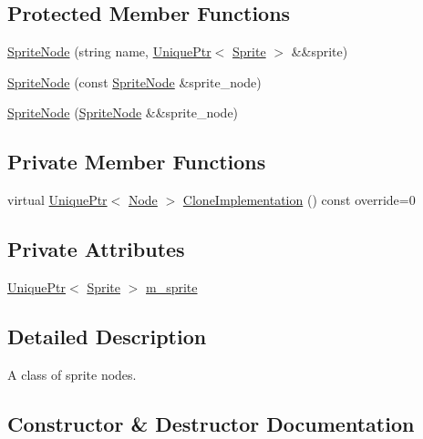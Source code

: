 \subsection*{Protected Member Functions}
\begin{DoxyCompactItemize}
\item 
\hyperlink{classmage_1_1_sprite_node_a17e7dc6256da6900a65dd35b38db2a1f}{Sprite\+Node} (string name, \hyperlink{namespacemage_a3316d7143a973e37adf1110f2e80ca31}{Unique\+Ptr}$<$ \hyperlink{classmage_1_1_sprite}{Sprite} $>$ \&\&sprite)
\item 
\hyperlink{classmage_1_1_sprite_node_a5744942fd29d59c34820d9bb3bdd17b7}{Sprite\+Node} (const \hyperlink{classmage_1_1_sprite_node}{Sprite\+Node} \&sprite\+\_\+node)
\item 
\hyperlink{classmage_1_1_sprite_node_af57c27c8fd399eb00f46a482192f6994}{Sprite\+Node} (\hyperlink{classmage_1_1_sprite_node}{Sprite\+Node} \&\&sprite\+\_\+node)
\end{DoxyCompactItemize}
\subsection*{Private Member Functions}
\begin{DoxyCompactItemize}
\item 
virtual \hyperlink{namespacemage_a3316d7143a973e37adf1110f2e80ca31}{Unique\+Ptr}$<$ \hyperlink{classmage_1_1_node}{Node} $>$ \hyperlink{classmage_1_1_sprite_node_a83a2a865b38670d64491a1066895e218}{Clone\+Implementation} () const override=0
\end{DoxyCompactItemize}
\subsection*{Private Attributes}
\begin{DoxyCompactItemize}
\item 
\hyperlink{namespacemage_a3316d7143a973e37adf1110f2e80ca31}{Unique\+Ptr}$<$ \hyperlink{classmage_1_1_sprite}{Sprite} $>$ \hyperlink{classmage_1_1_sprite_node_a5a330abe0fe7aca40bb4ef201e1c175c}{m\+\_\+sprite}
\end{DoxyCompactItemize}


\subsection{Detailed Description}
A class of sprite nodes. 

\subsection{Constructor \& Destructor Documentation}
\hypertarget{classmage_1_1_sprite_node_a04ada795f035b935af9992a6b7a75959}{}\label{classmage_1_1_sprite_node_a04ada795f035b935af9992a6b7a75959} 
